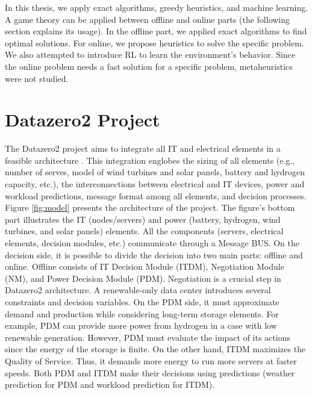 In this thesis, we apply exact algorithms, greedy heuristics, and machine learning. A game theory can be applied between offline and online parts (the following section explains its usage). In the offline part, we applied exact algorithms to find optimal solutions. For online, we propose heuristics to solve the specific problem. We also attempted to introduce RL to learn the environment's behavior. Since the online problem needs a fast solution for a specific problem, metaheuristics were not studied.

\section{Datazero2 Project}
\label{sec:datazero2_project}

The Datazero2 project aims to integrate all IT and electrical elements in a feasible architecture \cite{Datazero}. This integration englobes the sizing of all elements (e.g., number of serves, model of wind turbines and solar panels, battery and hydrogen capacity, etc.), the interconnections between electrical and IT devices, power and workload predictions, message format among all elements, and decision processes. Figure \ref{fig:model} presents the architecture of the project. The figure's bottom part illustrates the IT (nodes/servers) and power (battery, hydrogen, wind turbines, and solar panels) elements. All the components (servers, electrical elements, decision modules, etc.) communicate through a Message BUS. On the decision side, it is possible to divide the decision into two main parts: offline and online. Offline consists of IT Decision Module (ITDM), Negotiation Module (NM), and Power Decision Module (PDM). Negotiation is a crucial step in Datazero2 architecture. A renewable-only data center introduces several constraints and decision variables. On the PDM side, it must approximate demand and production while considering long-term storage elements. For example, PDM can provide more power from hydrogen in a case with low renewable generation. However, PDM must evaluate the impact of its actions since the energy of the storage is finite. On the other hand, ITDM maximizes the Quality of Service. Thus, it demands more energy to run more servers at faster speeds. Both PDM and ITDM make their decisions using predictions (weather prediction for PDM and workload prediction for ITDM).

